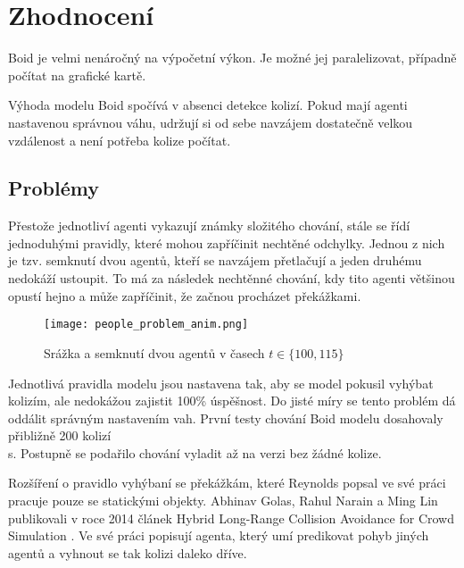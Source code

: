 \section{Zhodnocení}
Boid je velmi nenáročný na výpočetní výkon. Je možné jej paralelizovat, případně počítat na grafické kartě. 
\par
Výhoda modelu Boid spočívá v absenci detekce kolizí. Pokud mají agenti nastavenou správnou váhu, udržují si od sebe navzájem dostatečně velkou vzdálenost a není potřeba kolize počítat. 

\subsection{Problémy}
Přestože jednotliví agenti vykazují známky složitého chování, stále se řídí jednoduhými pravidly, které mohou zapříčinit nechtěné odchylky. Jednou z nich je tzv. semknutí dvou agentů, kteří se navzájem přetlačují a jeden druhému nedokáží ustoupit. To má za následek nechtěnné chování, kdy tito agenti většinou opustí hejno a může zapříčinit, že začnou procházet překážkami. 
\begin{figure}[H]
	\texttt{[image: people\_problem\_anim.png]}
	\centering
	\caption{Srážka a semknutí dvou agentů v časech $t\in\{ 100, 115\} $}
\end{figure}
Jednotlivá pravidla modelu jsou nastavena tak, aby se model pokusil vyhýbat kolizím, ale nedokážou zajistit 100\% úspěšnost. Do jisté míry se tento problém dá oddálit správným nastavením vah. První testy chování Boid modelu dosahovaly přibližně 200 kolizí\\s. Postupně se podařilo chování vyladit až na verzi bez žádné kolize. 
\par
Rozšíření o pravidlo vyhýbaní se překážkám, které Reynolds popsal ve své práci \cite{ReynoldsBoidNoBump} pracuje pouze se statickými objekty. Abhinav Golas, Rahul Narain a Ming Lin publikovali v roce 2014 článek Hybrid Long-Range Collision Avoidance for Crowd Simulation \cite{Golas2013}. Ve své práci popisují agenta, který umí predikovat pohyb jiných agentů a vyhnout se tak kolizi daleko dříve. 